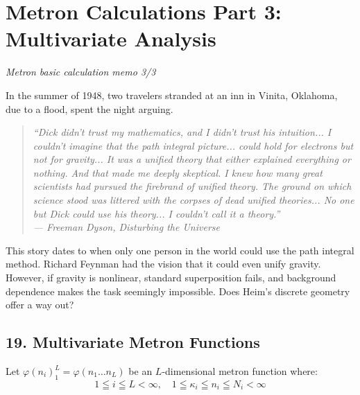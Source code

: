 \documentclass[11pt,a4paper,oneside]{article}
\newenvironment{fancyquote}
    {\begin{quote}\itshape\color{theoryblue!80!black}\guillemotleft\;}
    {\;\guillemotright\end{quote}}
\begin{document}
\section{Metron Calculations Part 3: Multivariate Analysis}
\textit{Metron basic calculation memo 3/3}

\begin{center}
\end{center}

In the summer of 1948, two travelers stranded at an inn in Vinita, Oklahoma, due to a flood, spent the night arguing.

\begin{fancyquote}
    \textit{``Dick didn't trust my mathematics, and I didn't trust his intuition... I couldn't imagine that the path integral picture... could hold for electrons but not for gravity... It was a unified theory that either explained everything or nothing. And that made me deeply skeptical. I knew how many great scientists had pursued the firebrand of unified theory. The ground on which science stood was littered with the corpses of dead unified theories... No one but Dick could use his theory... I couldn't call it a theory.''} \\
    --- Freeman Dyson, \textit{Disturbing the Universe}
\end{fancyquote}

This story dates to when only one person in the world could use the path integral method. Richard Feynman had the vision that it could even unify gravity. However, if gravity is nonlinear, standard superposition fails, and background dependence makes the task seemingly impossible. Does Heim's discrete geometry offer a way out?

\subsection{19. Multivariate Metron Functions}
Let $\varphi(n_i)_1^L = \varphi(n_1 \dots n_L)$ be an $L$-dimensional metron function where:
\begin{equation}
    1 \leqq i \leqq L < \infty, \quad 1 \leqq \kappa_i \leqq n_i \leqq N_i < \infty \tag{M9}
\end{equation}
\end{document}
